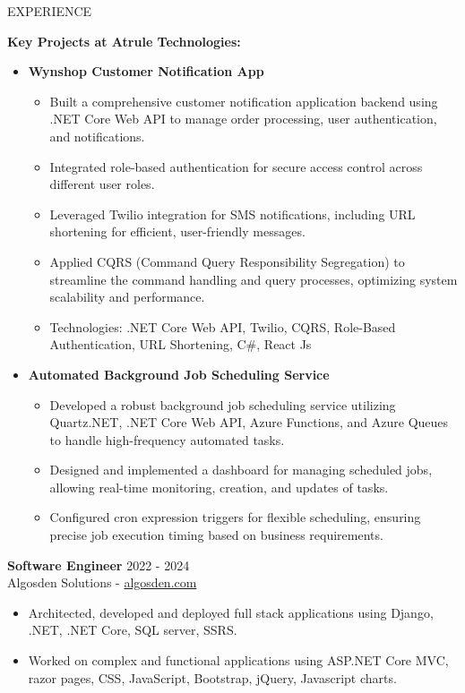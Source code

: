 \documentclass{resume} %
\begin{document}
\begin{rSection}{EXPERIENCE}
\begin{itemize}
		\textbf{Key Projects at Atrule Technologies:}
		\begin{itemize}
			\itemsep -3pt {} 
			\item \textbf {Wynshop Customer Notification App} 
			\begin{itemize}
				\itemsep -3pt {} 
				\item Built a comprehensive customer notification application backend using .NET Core Web API to manage order processing, user authentication, and notifications.
				\item Integrated role-based authentication for secure access control across different user roles.
				\item Leveraged Twilio integration for SMS notifications, including URL shortening for efficient, user-friendly messages.
				\item Applied CQRS (Command Query Responsibility Segregation) to streamline the command handling and query processes, optimizing system scalability and performance.
				\item Technologies: .NET Core Web API, Twilio, CQRS, Role-Based Authentication, URL Shortening, C\#, React Js
			\end{itemize}
			\item \textbf {Automated Background Job Scheduling Service} 
			\begin{itemize}
				\itemsep -3pt {} 
				\item Developed a robust background job scheduling service utilizing Quartz.NET, .NET Core Web API, Azure Functions, and Azure Queues to handle high-frequency automated tasks.
				\item Designed and implemented a dashboard for managing scheduled jobs, allowing real-time monitoring, creation, and updates of tasks.
				\item Configured cron expression triggers for flexible scheduling, ensuring precise job execution timing based on business requirements.
			\end{itemize}
		\end{itemize}
		
	\end{itemize}
	\textbf{Software Engineer} \hfill 2022 - 2024\\
	Algosden Solutions -  \href{https://www.algosden.com/}{algosden.com}
		\begin{itemize}
		\itemsep -3pt {} 
		\item Architected, developed and deployed full stack applications using Django, .NET, .NET Core, SQL server, SSRS.
		\item Worked on complex and functional applications using ASP.NET Core MVC, razor pages, CSS, JavaScript, Bootstrap, jQuery, Javascript charts.
		

\end{itemize}
\end{rSection}
\end{document}
